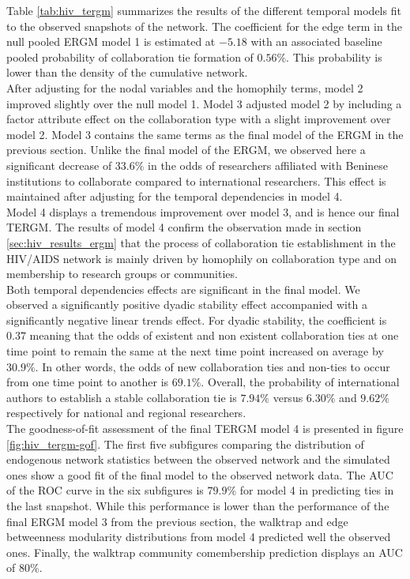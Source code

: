 Table \ref{tab:hiv_tergm} summarizes the results of the different temporal models fit to the observed snapshots of the network. The coefficient for the edge term in the null pooled ERGM model 1 is estimated at $-5.18$ with an associated baseline pooled probability of collaboration tie formation of $0.56\%$. This probability is lower than the density of the cumulative network.\\
After adjusting for the nodal variables and the homophily terms, model 2 improved slightly over the null model 1. Model 3 adjusted model 2 by including a factor attribute effect on the collaboration type with a slight improvement over model 2. Model 3 contains the same terms as the final model of the ERGM in the previous section. Unlike the final model of the ERGM, we observed here a significant decrease of $33.6\%$ in the odds of researchers affiliated with Beninese institutions to collaborate compared to international researchers. This effect is maintained after adjusting for the temporal dependencies in model 4. \\
Model 4 displays a tremendous improvement over model 3, and is hence our final TERGM. The results of model 4 confirm the observation made in section \ref{sec:hiv_results_ergm} that the process of collaboration tie establishment in the HIV/AIDS network is mainly driven by homophily on collaboration type and on membership to research groups or communities. \\
Both temporal dependencies effects are significant in the final model. We observed a significantly positive dyadic stability effect accompanied with a significantly negative linear trends effect. For dyadic stability, the coefficient is $0.37$ meaning that the odds of existent and non existent collaboration ties at one time point to remain the same at the next time point increased on average by $30.9\%$. In other words, the odds of new collaboration ties and non-ties to occur from one time point to another is $69.1\%$. Overall, the probability of international authors to establish a stable collaboration tie is $7.94\%$ versus $6.30\%$ and $9.62\%$ respectively for national and regional researchers.\\
The goodness-of-fit assessment of the final TERGM model 4 is presented in figure \ref{fig:hiv_tergm-gof}. The first five subfigures comparing the distribution of endogenous network statistics between the observed network and the simulated ones show a good fit of the final model to the observed network data. The AUC of the ROC curve in the six subfigures is $79.9\%$ for model 4 in predicting ties in the last snapshot. While this performance is lower than the performance of the final ERGM model 3 from the previous section, the walktrap and edge betweenness modularity distributions from model 4 predicted well the observed ones. Finally, the walktrap community comembership prediction displays an AUC of $80\%$. %


